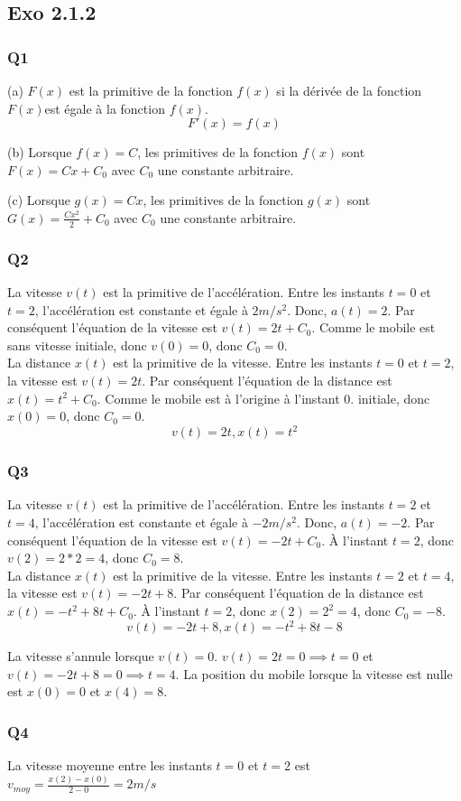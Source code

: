 \documentclass[]{book}
\theoremstyle{definition}
\begin{document}
\subsection*{Exo 2.1.2}
\subsubsection*{Q1}
(a) $F(x)$ est la primitive de la fonction $f(x)$ si la d\'eriv\'ee de
la fonction $F(x)$est \'egale \`a la fonction $f(x)$.
$$F'(x) = f(x)$$

(b) Lorsque $f(x) = C$, les primitives de la fonction $f(x)$ sont
$F(x) = Cx + C_0$ avec $C_0$ une constante arbitraire.

(c) Lorsque $g(x) = Cx$, les primitives de la fonction $g(x)$ sont
$G(x) = \frac{Cx^2}{2} + C_0$ avec $C_0$ une constante arbitraire.

\subsubsection*{Q2}
La vitesse $v(t)$ est la primitive de l'acc\'el\'eration. Entre
les instants $t=0$ et $t=2$, l'acc\'el\'eration est constante et
\'egale \`a $2m/s^2$. Donc, $a(t) = 2$. Par cons\'equent l'\'equation
de la vitesse est $v(t) = 2t+C_0$. Comme le mobile est sans vitesse
initiale, donc $v(0)=0$, donc $C_0 = 0$.
\\
La distance $x(t)$ est la primitive de la vitesse. Entre
les instants $t=0$ et $t=2$, la vitesse est $v(t) = 2t$. Par cons\'equent l'\'equation
de la distance est $x(t) = t^2+C_0$. Comme le mobile est \`a l'origine
\`a l'instant 0.
initiale, donc $x(0)=0$, donc $C_0 = 0$.
$$v(t)=2t, x(t)=t^2$$


\subsubsection*{Q3}
La vitesse $v(t)$ est la primitive de l'acc\'el\'eration. Entre
les instants $t=2$ et $t=4$, l'acc\'el\'eration est constante et
\'egale \`a $-2m/s^2$. Donc, $a(t) = -2$. Par cons\'equent l'\'equation
de la vitesse est $v(t) = -2t+C_0$. \`A l'instant $t=2$, donc
$v(2)=2*2=4$, donc $C_0 = 8$.
\\
La distance $x(t)$ est la primitive de la vitesse. Entre
les instants $t=2$ et $t=4$, la vitesse est $v(t) = -2t+8$. Par cons\'equent l'\'equation
de la distance est $x(t) = -t^2+8t+C_0$. \`A l'instant $t=2$, donc $x(2)=2^2=4$, donc $C_0 = -8$.
$$v(t)=-2t+8, x(t)=-t^2+8t-8$$


La vitesse s'annule lorsque $v(t)=0$. $v(t) = 2t = 0 \implies t = 0$ et
$v(t) = -2t +8 = 0 \implies t = 4$. La position du mobile lorsque la
vitesse est nulle est $x(0) = 0$ et $x(4) = 8$.

\subsubsection*{Q4}
La vitesse moyenne entre les instants $t=0$ et $t=2$ est
$v_{moy}=\frac{x(2)-x(0)}{2-0}=2 m/s$
\end{document}

